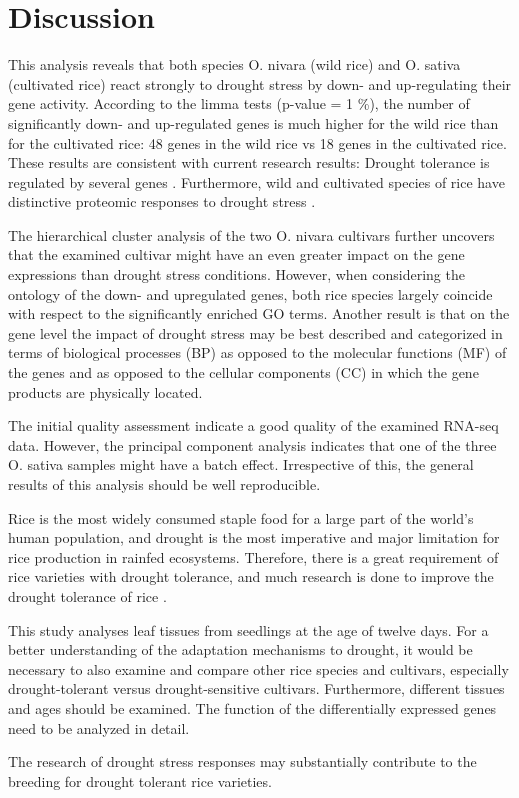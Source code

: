 \section{Discussion}

This analysis reveals that both species O. nivara (wild rice) and O. sativa (cultivated rice) react strongly to drought stress by down- and up-regulating their gene activity. According to the limma tests (p-value = 1 \%), the number of significantly down- and up-regulated genes is much higher for the wild rice than for the cultivated rice: 48 genes in the wild rice vs 18 genes in the cultivated rice. These results are consistent with current research results: Drought tolerance is regulated by several genes \autocite{10.3389/fpls.2016.01029}. Furthermore, wild and cultivated species of rice have distinctive proteomic responses to drought stress \autocite{10.3390/ijms21175980}.

The hierarchical cluster analysis of the two O. nivara cultivars further uncovers that the examined cultivar might have an even greater impact on the gene expressions than drought stress conditions. However, when considering the ontology of the down- and upregulated genes, both rice species largely coincide with respect to the significantly enriched GO terms. Another result is that on the gene level the impact of drought stress may be best described and categorized in terms of biological processes (BP) as opposed to the molecular functions (MF) of the genes and as opposed to the cellular components (CC) in which the gene products are physically located.

The initial quality assessment indicate a good quality of the examined RNA-seq data. However, the principal component analysis indicates that one of the three O. sativa samples might have a batch effect. Irrespective of this, the general results of this analysis should be well reproducible.

Rice is the most widely consumed staple food for a large part of the world's human population, and drought is the most imperative and major limitation for rice production in rainfed ecosystems. Therefore, there is a great requirement of rice varieties with drought tolerance, and much research is done to improve the drought tolerance of rice \autocite{10.1016/j.rsci.2021.01.002}.

This study analyses leaf tissues from seedlings at the age of twelve days. For a better understanding of the adaptation mechanisms to drought, it would be necessary to also examine and compare other rice species and cultivars, especially drought-tolerant versus drought-sensitive cultivars. Furthermore, different tissues and ages should be examined. The function of the differentially expressed genes need to be analyzed in detail.

The research of drought stress responses may substantially contribute to the breeding for drought tolerant rice varieties.